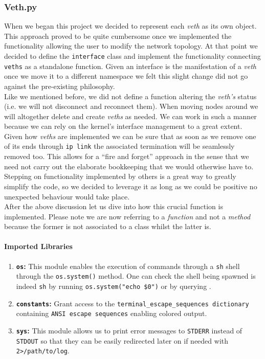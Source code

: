 \subsubsection{Veth.py}
    When we began this project we decided to represent each \textit{veth} as its own object. This approach proved to be quite cumbersome once we implemented the functionality allowing the user to modify the network topology. At that point we decided to define the \texttt{interface} class and implement the functionality connecting \texttt{veths} as a standalone function. Given an interface is the manifestation of a \textit{veth} once we move it to a different namespace we felt this slight change did not go against the pre-existing philosophy.\\

    Like we mentioned before, we did not define a function altering the \textit{veth's} status (i.e. we will not disconnect and reconnect them). When moving nodes around we will altogether delete and create \textit{veths} as needed. We can work in such a manner because we  can rely on the kernel's interface management to a great extent. Given how \textit{veths} are implemented we can be sure that as soon as we remove one of its ends through \texttt{ip link} the associated termination will be seamlessly removed too. This allows for a ``fire and forget'' approach in the sense that we need not carry out the elaborate bookkeeping that we would otherwise have to. Stepping on functionality implemented by others is a great way to greatly simplify the code, so we decided to leverage it as long as we could be positive no unexpected behaviour would take place.\\

    After the above discussion let us dive into how this crucial function is implemented. Please note we are now referring to a \textit{function} and not a \textit{method} because the former is not associated to a class whilst the latter is.\\

    \paragraph{Imported Libraries}
        \begin{enumerate}
            \item \textbf{\texttt{os}:} This module enables the execution of commands through a \texttt{sh} shell through the \texttt{os.system()} method. One can check the shell being spawned is indeed \texttt{sh} by running \texttt{\allowbreak os.system("echo \$0")} or by querying \cite{bib:man-system}.
            \item \textbf{\texttt{constants}:} Grant access to the \texttt{\allowbreak terminal\_escape\_sequences dictionary} containing \texttt{ANSI escape sequences} enabling colored output.
            \item \textbf{\texttt{sys}:} This module allows us to print error messages to \texttt{STDERR} instead of \texttt{STDOUT} so that they can be easily redirected later on if needed with \texttt{2>/path/to/log}.
        \end{enumerate}

